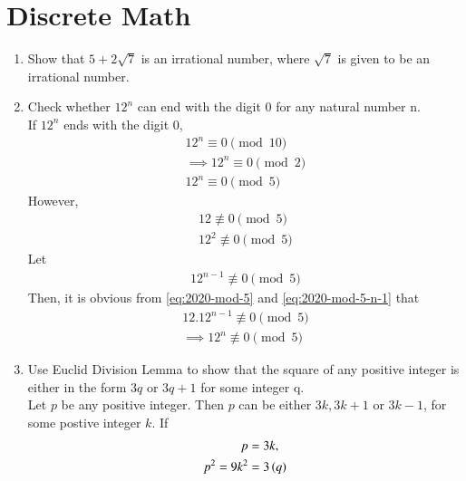 \documentclass[journal,12pt,twocolumn]{IEEEtran}
\renewcommand\thesection{\arabic{section}}
\begin{document}
\section{Discrete Math}
\begin{enumerate}[label=\thesection.\arabic*.,ref=\thesection.\theenumi]
        \item Show that $5 + 2\sqrt{7}$ is an irrational number, where $\sqrt{7}$ is given to be an irrational number.\\
        \item Check whether $12^n$ can end with the digit 0 for any natural number n.\\
		\solution  If $12^n$ ends with the digit 0, 
		    \begin{align}
			    12^{n} \equiv 0 {\pmod{10}}
			    \\
			    \implies 
			    12^{n} \equiv 0 {\pmod{2}}
			    \\
			    12^{n} \equiv 0 {\pmod{5}}
		    \end{align}
		    However, 
		    \begin{align}
			    \label{eq:2020-mod-5}
			    12 \not\equiv 0 {\pmod{5}}
			    \\
			    12^2 \not\equiv 0 {\pmod{5}}
		    \end{align}
		    Let 
		    \begin{align}
			    \label{eq:2020-mod-5-n-1}
			    12^{n-1} \not \equiv 0 {\pmod{5}}
		    \end{align}
		    Then, it is obvious from
			    \eqref{eq:2020-mod-5} and 
			    \eqref{eq:2020-mod-5-n-1}
			    that 
		    \begin{align}
			    12.12^{n-1} \not \equiv 0 {\pmod{5}}
			    \\
			    \implies 
			    12^{n} \not \equiv 0 {\pmod{5}}
		    \end{align}
    \item Use Euclid Division Lemma to show that the square of any positive integer is either in the form $3q$ or $3q + 1$ for some integer q.\\
	    \solution Let $p$ be any positive integer.  Then $p$ can be either $3k, 3k+1$ or $3k-1$, for some postive integer $k$.  If
	    \begin{align}
		    p &= 3k, 
		    \\
		    p^2 = 9k^2 &= 3\brak{q}

\end{align}
\end{enumerate}
\end{document}
